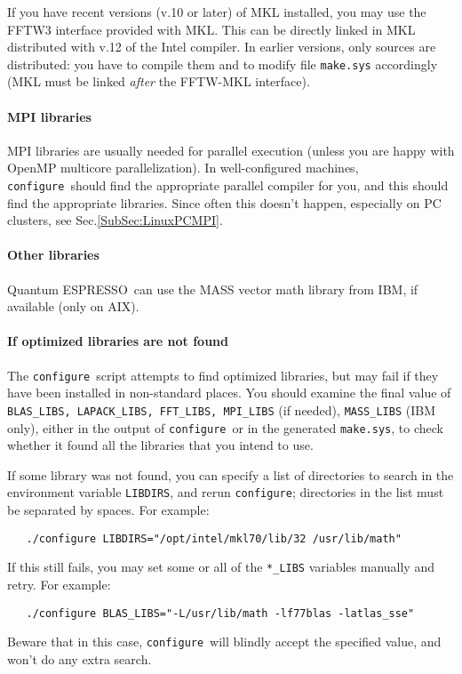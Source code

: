 \documentclass[12pt,a4paper]{article}
\def\qe{{\sc Quantum ESPRESSO}}
\def\configure{\texttt{configure}}
\begin{document}
If you have recent versions (v.10 or later) of MKL installed, you 
may use the FFTW3 interface provided with MKL. This can be directly
linked in MKL distributed with v.12 of the Intel compiler. In earlier 
versions, only sources are distributed: you have to compile them and 
to modify file \texttt{make.sys} accordingly 
(MKL must be linked {\em after} the FFTW-MKL interface).

\paragraph{MPI libraries} 
MPI libraries are usually needed for parallel execution 
(unless you are happy with OpenMP multicore parallelization).
In well-configured machines, \configure\ should find the appropriate
parallel compiler for you, and this should find the appropriate
libraries. Since often this doesn't 
happen, especially on PC clusters, see Sec.\ref{SubSec:LinuxPCMPI}.

\paragraph{Other libraries}
\qe\ can use the MASS vector math
library from IBM, if available (only on AIX).

\paragraph{If optimized libraries are not found}
The \configure\ script attempts to find optimized libraries, but may fail
if they have been installed in non-standard places. You should examine
the final value of \texttt{BLAS\_LIBS, LAPACK\_LIBS, FFT\_LIBS, MPI\_LIBS} (if needed),
\texttt{MASS\_LIBS} (IBM only), either in the output of \configure\ or in the generated
\texttt{make.sys}, to check whether it found all the libraries that you intend to use.
    
If some library was not found, you can specify a list of directories to search
in the environment variable \texttt{LIBDIRS}, 
and rerun \configure; directories in the
list must be separated by spaces. For example:
\begin{verbatim}
   ./configure LIBDIRS="/opt/intel/mkl70/lib/32 /usr/lib/math"
\end{verbatim}
If this still fails, you may set some or all of the \texttt{*\_LIBS} variables manually
and retry. For example:
\begin{verbatim}
   ./configure BLAS_LIBS="-L/usr/lib/math -lf77blas -latlas_sse"
\end{verbatim}
Beware that in this case, \configure\ will blindly accept the specified value,
and won't do any extra search. 
    
\end{document}
